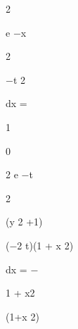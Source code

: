 \documentclass[a4paper,portrait,12pt]{article}
\begin{document}
2





\begin{flushleft}
e $-$x
\end{flushleft}





2





\begin{flushleft}
$-$t 2
\end{flushleft}





\begin{flushleft}
dx =
\end{flushleft}





1


0





\begin{flushleft}
2 e $-$t
\end{flushleft}





2





\begin{flushleft}
(y 2 +1)
\end{flushleft}





\begin{flushleft}
($-$2 t)(1 + x 2)
\end{flushleft}


\begin{flushleft}
dx = $-$
\end{flushleft}


\begin{flushleft}
1 + x2
\end{flushleft}





\begin{flushleft}
(1+x 2)
\end{flushleft}
\end{document}
